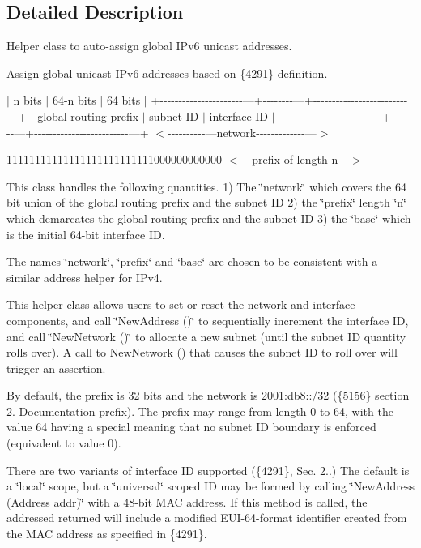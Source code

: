 \subsection{Detailed Description}
Helper class to auto-\/assign global I\+Pv6 unicast addresses. 

Assign global unicast I\+Pv6 addresses based on \{4291\} definition.

$\vert$ n bits $\vert$ 64-\/n bits $\vert$ 64 bits $\vert$ +-\/-\/-\/-\/-\/-\/-\/-\/-\/-\/-\/-\/-\/-\/-\/-\/-\/-\/-\/-\/-\/-\/---+-\/-\/-\/-\/-\/-\/-\/-\/---+-\/-\/-\/-\/-\/-\/-\/-\/-\/-\/-\/-\/-\/-\/-\/-\/-\/-\/-\/-\/-\/-\/-\/-\/-\/---+ $\vert$ global routing prefix $\vert$ subnet ID $\vert$ interface ID $\vert$ +-\/-\/-\/-\/-\/-\/-\/-\/-\/-\/-\/-\/-\/-\/-\/-\/-\/-\/-\/-\/-\/-\/---+-\/-\/-\/-\/-\/-\/-\/-\/---+-\/-\/-\/-\/-\/-\/-\/-\/-\/-\/-\/-\/-\/-\/-\/-\/-\/-\/-\/-\/-\/-\/-\/-\/-\/---+ $<$-\/-\/-\/-\/-\/-\/-\/-\/-\/-\/---network-\/-\/-\/-\/-\/-\/-\/-\/-\/-\/-\/-\/-\/---$>$

11111111111111111111111111000000000000 $<$---prefix of length n---$>$

This class handles the following quantities. 1) The \char`\"{}network\char`\"{} which covers the 64 bit union of the global routing prefix and the subnet ID 2) the \char`\"{}prefix\char`\"{} length \char`\"{}n\char`\"{} which demarcates the global routing prefix and the subnet ID 3) the \char`\"{}base\char`\"{} which is the initial 64-\/bit interface ID.

The names \char`\"{}network\char`\"{}, \char`\"{}prefix\char`\"{} and \char`\"{}base\char`\"{} are chosen to be consistent with a similar address helper for I\+Pv4.

This helper class allows users to set or reset the network and interface components, and call \char`\"{}\+New\+Address ()\char`\"{} to sequentially increment the interface ID, and call \char`\"{}\+New\+Network ()\char`\"{} to allocate a new subnet (until the subnet ID quantity rolls over). A call to New\+Network () that causes the subnet ID to roll over will trigger an assertion.

By default, the prefix is 32 bits and the network is \textquotesingle{}2001\+:db8\+:\+:/32\textquotesingle{} (\{5156\} section 2. Documentation prefix). The prefix may range from length 0 to 64, with the value 64 having a special meaning that no subnet ID boundary is enforced (equivalent to value 0).

There are two variants of interface ID supported (\{4291\}, Sec. 2..) The default is a \char`\"{}local\char`\"{} scope, but a \char`\"{}universal\char`\"{} scoped ID may be formed by calling \char`\"{}\+New\+Address (\+Address addr)\char`\"{} with a 48-\/bit M\+AC address. If this method is called, the addressed returned will include a modified E\+U\+I-\/64-\/format identifier created from the M\+AC address as specified in \{4291\}.


